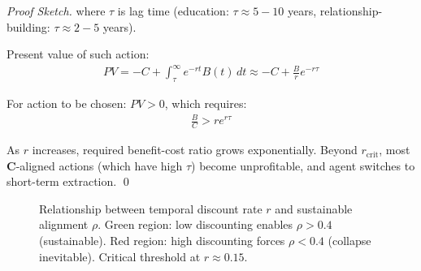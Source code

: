 \documentclass[11pt,a4paper]{article}
\theoremstyle{definition}
\theoremstyle{remark}
\begin{document}
\begin{small}
\begin{enumerate}
\begin{proof}[Proof Sketch]
where \(\tau\) is lag time (education: \(\tau \approx 5-10\) years, relationship-building: \(\tau \approx 2-5\) years).

Present value of such action:
\begin{align}
PV = -C + \int_\tau^\infty e^{-rt} B(t) \, dt \approx -C + \frac{B}{r} e^{-r\tau}
\end{align}

For action to be chosen: \(PV > 0\), which requires:
\begin{align}
\frac{B}{C} > r e^{r\tau}
\end{align}

As \(r\) increases, required benefit-cost ratio grows exponentially. Beyond \(r_{\text{crit}}\), most \(\mathbf{C}\)-aligned actions (which have high \(\tau\)) become unprofitable, and agent switches to short-term extraction. \qed
\end{proof}

\begin{figure}[H]
\centering
{}
\caption{Relationship between temporal discount rate \(r\) and sustainable alignment \(\rho\). Green region: low discounting enables \(\rho > 0.4\) (sustainable). Red region: high discounting forces \(\rho < 0.4\) (collapse inevitable). Critical threshold at \(r \approx 0.15\).}
\label{fig:discount_alignment}
\end{figure}


\end{enumerate}
\end{small}
\end{document}
